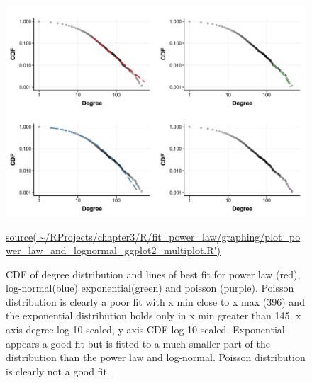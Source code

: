 \begin{figure}
    \centering
    \includegraphics[width=\textwidth]{images/chapter3/poweRlaw/multiplot/Rplot_multiplot_with_x_min_each_distribution.png}
    \caption{CDF of degree distribution and lines of best fit for power law (red), log-normal(blue) exponential(green) and poisson (purple). Poisson distribution is clearly a poor fit with x min close to x max (396) and the exponential distribution holds only in x min greater than 145. x axis degree log 10 scaled, y axis CDF log 10 scaled. Exponential appears a good fit but is fitted to a much smaller part of the distribution than the power law and log-normal. Poisson distribution is clearly not a good fit.}
    \small\url{source('~/RProjects/chapter3/R/fit_power_law/graphing/plot_power_law_and_lognormal_ggplot2_multiplot.R')}
    \label{fig:CDF degreel_multiplot}
\end{figure}



